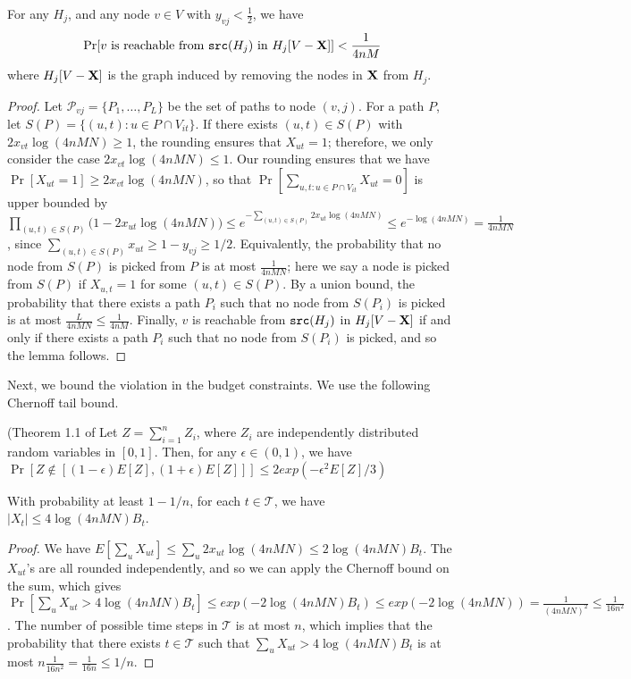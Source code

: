 \begin{lemma}
\label{lem:disconnect}
For any $H_j$, and any node $v\in V$ with $y_{vj} < \frac{1}{2}$, we have
\[
\Pr[\mbox{$v$ is reachable from $\texttt{src}(H_j)$ in $H_j[V-\mathbf{X}]$}] < \frac{1}{4nM}
\]
where $H_j[V-\mathbf{X}]$ is the graph induced by removing the nodes in $\mathbf{X}$ from $H_j$.
\end{lemma}
\begin{proof}
Let $\mathcal{P}_{vj} = \{P_1, \ldots,P_L\}$ be the  set of paths to node $(v,j)$. 
For a path $P$, let $S(P)=\{(u, t): u\in P\cap V_{it}\}$.
If there exists $(u, t)\in S(P)$ with $2 x_{vt} \log(4nMN) \geq 1$, the rounding ensures that $X_{ut}=1$;
therefore, we only consider the case $2 x_{vt} \log(4nMN)\leq 1$.
Our rounding ensures that we have $\Pr[X_{ut}=1] \geq 2 x_{vt} \log(4nMN)$, so that
$\Pr[\sum_{u, t: u\in P\cap V_{it}} X_{ut} = 0]$ is upper bounded by
$\prod_{(u,t) \in S(P)} \big(1- 2 x_{ut} \log(4nMN)\big) \leq e^{-\sum_{(u, t)\in S(P)} 2 x_{ut} \log(4nMN)}
\leq e^{-\log(4nMN)}= \frac{1}{4nMN}$,
since $\sum_{(u, t)\in S(P)} x_{ut} \geq 1-y_{vj} \geq 1/2$.
Equivalently, the probability that no node from $S(P)$ is picked from $P$ is at most $\frac{1}{4nMN}$;
here we say a node is picked from $S(P)$ if $X_{u,t}=1$ for some $(u, t)\in S(P)$.
By a union bound, the probability that there exists a path $P_i$ such that no node from
$S(P_i)$ is picked is at most $\frac{L}{4nMN}\leq \frac{1}{4nM}$.
Finally, $v$ is reachable from $\texttt{src}(H_j)$ in $H_j[V-\mathbf{X}]$ if and only if there exists a path $P_i$ such that no node from
$S(P_i)$ is picked, and so the lemma follows.
\end{proof}

Next, we bound the violation in the budget constraints. We use the following Chernoff tail bound.

\begin{theorem} (Theorem 1.1 of \cite{books/daglib/0025902}
Let $Z=\sum_{i=1}^n Z_i$, where $Z_i$ are independently distributed random variables in $[0, 1]$. Then, for any $\epsilon\in(0, 1)$, we have
$\Pr[Z\not\in[(1-\epsilon)E[Z], (1+\epsilon)E[Z]]]\leq 2 exp(-\epsilon^2 E[Z]/3)$


\end{theorem}

\noindent
\begin{lemma}
\label{lem:budget}
With probability at least $1-1/n$, for each $t\in \mathcal{T}$, we have
$|X_t|\leq 4\log(4nMN)B_t$.
\end{lemma}
\begin{proof}
We have $E[\sum_u X_{ut}]\leq \sum_u 2x_{ut}\log(4nMN) \leq 2\log(4nMN)B_t$.
The $X_{ut}$'s are all rounded independently, and so we can apply the Chernoff bound on the sum, which gives
$\Pr[\sum_u X_{ut} > 4\log(4nMN)B_t] \leq exp(-2\log(4nMN)B_t) \leq exp(-2\log(4nMN))= \frac{1}{(4nMN)^2}\leq \frac{1}{16n^2}$.
The number of possible time steps in $\mathcal{T}$ is at most $n$, which implies that the probability that there exists 
$t\in\mathcal{T}$ such that $\sum_u X_{ut} > 4\log(4nMN)B_t$ is at most $n\frac{1}{16n^2}=\frac{1}{16n}\leq 1/n$.
\end{proof}

